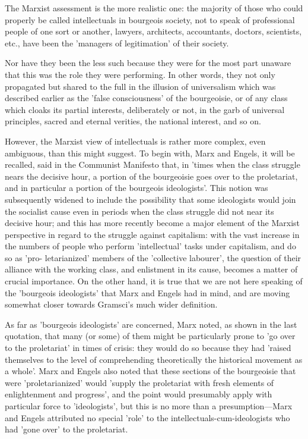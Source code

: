 The Marxist assessment is the more realistic one: the majority of those who could properly be called intellectuals in bourgeois society, not to speak of professional people of one sort or another, lawyers, architects, accountants, doctors, scientists, etc., have been the 'managers of legitimation' of their society.

Nor have they been the less such because they were for the most part unaware that this was the role they were performing. In other words, they not only propagated but shared to the full in the illusion of universalism which was described earlier as the 'false consciousness' of the bourgeoisie, or of any class which cloaks its partial interests, deliberately or not, in the garb of universal principles, sacred and eternal verities, the national interest, and so on.

However, the Marxist view of intellectuals is rather more complex, even ambiguous, than this might suggest. To begin with, Marx and Engels, it will be recalled, said in the Communist Manifesto that, in 'times when the class struggle nears the decisive hour, a portion of the bourgeoisie goes over to the proletariat, and in particular a portion of the bourgeois ideologists'. This notion was subsequently widened to include the possibility that some ideologists would join the socialist cause even in periods when the class struggle did not near its decisive hour; and this has more recently become a major element of the Marxist perspective in regard to the struggle against capitalism: with the vast increase in the numbers of people who perform 'intellectual' tasks under capitalism, and do so as 'pro- letarianized' members of the 'collective labourer', the question of their alliance with the working class, and enlistment in its cause, becomes a matter of crucial importance. On the other hand, it is true that we are not here speaking of the 'bourgeois ideologists' that Marx and Engels had in mind, and are moving somewhat closer towards Gramsci's much wider definition.

As far as 'bourgeois ideologists' are concerned, Marx noted, as shown in the last quotation, that many (or some) of them might be particularly prone to 'go over to the proletariat' in times of crisis: they would do so because they had 'raised themselves to the level of comprehending theoretically the historical movement as a whole'. Marx and Engels also noted that these sections of the bourgeoisie that were 'proletarianized' would 'supply the proletariat with fresh elements of enlightenment and progress', and the point would presumably apply with particular force to 'ideologists', but this is no more than a presumption—Marx and Engels attributed no special 'role' to the intellectuals\hyp{}cum\hyp{}ideologists who had 'gone over' to the proletariat.

